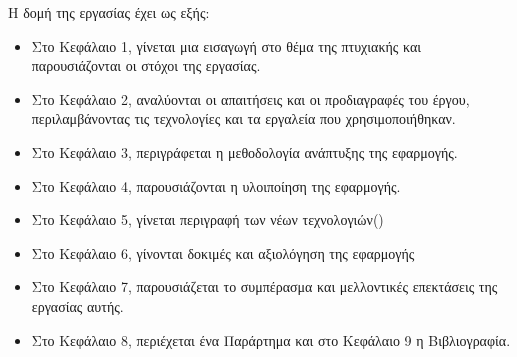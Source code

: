 Η δομή της εργασίας έχει ως εξής:
\begin{itemize}
    \item Στο Κεφάλαιο 1, γίνεται μια εισαγωγή στο θέμα της πτυχιακής και παρουσιάζονται οι στόχοι της εργασίας.
    \item Στο Κεφάλαιο 2, αναλύονται οι απαιτήσεις και οι προδιαγραφές του έργου, περιλαμβάνοντας τις τεχνολογίες και τα εργαλεία που χρησιμοποιήθηκαν.
    \item Στο Κεφάλαιο 3, περιγράφεται η μεθοδολογία ανάπτυξης της εφαρμογής.
    \item Στο Κεφάλαιο 4, παρουσιάζονται η υλοιποίηση της εφαρμογής.
    \item Στο Κεφάλαιο 5, γίνεται περιγραφή των νέων τεχνολογιών()
    \item Στο Κεφάλαιο 6, γίνονται δοκιμές και αξιολόγηση της εφαρμογής
    \item Στο Κεφάλαιο 7, παρουσιάζεται το συμπέρασμα και μελλοντικές επεκτάσεις της εργασίας αυτής.
    \item Στο Κεφάλαιο 8, περιέχεται ένα Παράρτημα και στο Κεφάλαιο 9 η Βιβλιογραφία.
\end{itemize}